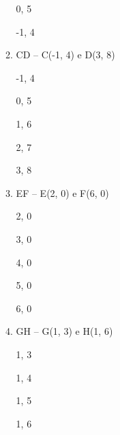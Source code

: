 \begin{enumerate}
\begin{enumerate}[label=\alph*.]
                         0, 5
                         
                         -1, 4
									
					\item  CD – C(-1, 4) e D(3, 8)
					
						 -1, 4
						 
						 0, 5
						  
						 1, 6
						  
						 2, 7
						  
						 3, 8
									
					\item EF – E(2, 0) e F(6, 0)
					
						2, 0
						
						3, 0
						
						4, 0
						
						5, 0
						
						6, 0
									
					\item   GH – G(1, 3) e H(1, 6)
									
                      1, 3
                      
                      1, 4
                      
                      1, 5
                      
                      1, 6
									
				\end{enumerate}
	
	\end{enumerate}